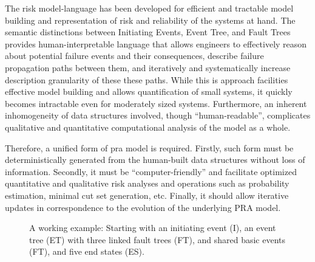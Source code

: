


The risk model-language has been developed for efficient and tractable model building and representation of risk and reliability of the systems at hand.
The semantic distinctions between Initiating Events, Event Tree, and Fault Trees provides human-interpretable language that allows engineers to effectively reason about potential failure events and their consequences, describe failure propagation paths between them, and iteratively and systematically increase description granularity of these these paths.
While this is approach facilities effective model building and allows quantification of small systems, it quickly becomes intractable even for moderately sized systems. 
Furthermore, an inherent inhomogeneity of data structures involved, though ``human-readable'', complicates qualitative and quantitative computational analysis of the model as a whole. 

Therefore, a unified form of \acrshort{pra} model is required. 
Firstly, such form must be deterministically generated from the human-built data structures without loss of information.
Secondly, it must be ``computer-friendly'' and facilitate optimized quantitative and qualitative risk analyses and operations such as probability estimation, minimal cut set generation, etc.
Finally, it should allow iterative updates in correspondence to the evolution of the underlying PRA model.

\begin{figure}[p]
    \centering
    
    \caption{A working example: Starting with an initiating event (I), an event tree (ET) with three linked fault trees (FT), and shared basic events (FT), and five end states (ES).}
    \label{fig:et_ft_example}
\end{figure}


